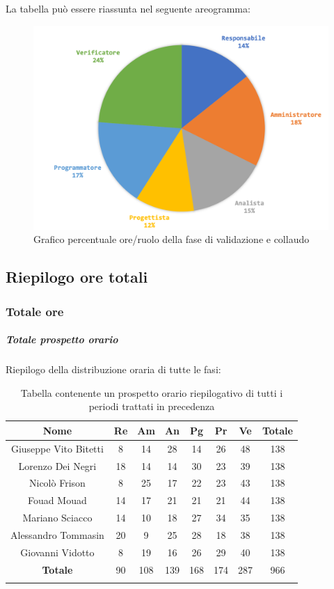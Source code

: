 		La tabella può essere riassunta nel seguente areogramma:
		\begin{figure}[H]
			\centering
			\includegraphics[width=0.8\linewidth]{./images/preventivo/validColl2.png}
			\caption{Grafico percentuale ore/ruolo della fase di validazione e collaudo}
			\label{fig:grafico costi ruolo fase di validazione e collaudo}
		\end{figure}		
		

		
	\subsection{Riepilogo ore totali}
		\subsubsection{Totale ore}
			\subparagraph{Totale prospetto orario }
			Riepilogo della distribuzione oraria di tutte le fasi:
			\begin{longtable}{|c|c|c|c|c|c|c|c|}
				\hline
				\rowcolor{lighter-grayer}
				\textbf{Nome} & \textbf{Re} & \textbf{Am} & \textbf{An} & \textbf{Pg}  & \textbf{Pr}   & \textbf{Ve} & \textbf{Totale} \\
				\hline
				\endfirsthead
				
				\hline
				Giuseppe Vito Bitetti 		& 8 & 14 & 28 & 14 & 26 & 48 & 138\\
				\hline
				\hline
				Lorenzo Dei Negri			& 18 & 14 & 14 & 30 & 23 & 39 & 138\\
				\hline
				\hline
				Nicolò Frison				    & 8 & 25 & 17 & 22 & 23 & 43 & 138\\
				\hline
				\hline
				Fouad Mouad 				 & 14 & 17 & 21 & 21 & 21 & 44 & 138\\
				\hline
				\hline
				Mariano Sciacco 			& 14 & 10 & 18 & 27 & 34 & 35 & 138\\
				\hline
				\hline
				Alessandro Tommasin    & 20 & 9 & 25 & 28 & 18 & 38 & 138\\
				\hline
				\hline
				Giovanni Vidotto 			 & 8 & 19 & 16 & 26 & 29 & 40 & 138\\
				\hline 
				\textbf{Totale}				 & 90 & 108 & 139 & 168 & 174 & 287 & 966\\
				\hline
				\caption{Tabella contenente un prospetto orario riepilogativo di tutti i periodi trattati in precedenza}
			\end{longtable}
			\pagebreak
			
